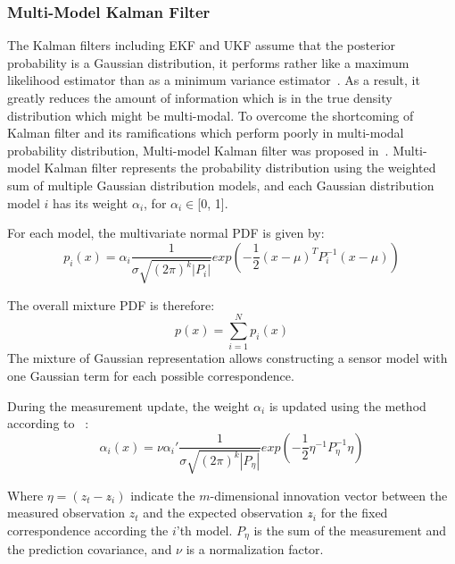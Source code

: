 \subsubsection{Multi-Model Kalman Filter}\label{sub:mmkalman}
The Kalman filters including \gls{EKF} and \gls{UKF} assume that the posterior probability is a Gaussian distribution, it performs rather like a maximum likelihood estimator than as a minimum variance estimator~\cite{alspach1972nonlinear}. As a result, it greatly reduces the amount of information which is in the true density distribution which might be multi-modal. To overcome the shortcoming of Kalman filter and its ramifications which perform poorly in multi-modal probability distribution, Multi-model Kalman filter was proposed in~\cite{alspach1972nonlinear}. Multi-model Kalman filter represents the probability distribution using the weighted sum of multiple Gaussian distribution models, and each Gaussian distribution model $i$ has its weight $\alpha_i$, for $\alpha_i \in $[0, 1].

For each model, the multivariate normal \gls{PDF} is given by:
\begin{equation}
\label{eq:mmkalman}
p_{i}(x) = \alpha_i\frac{1}{\sigma \sqrt {(2\pi)^k|P_i|}}exp(-\frac{1}{2}(x-\mu)^TP_i^{-1}(x-\mu))
\end{equation}

The overall mixture \gls{PDF} is therefore:
\begin{equation}
\label{eq:mmkalmansum}
p(x) = \sum_{i=1}^{N}p_i(x)
\end{equation}
The mixture of Gaussian representation allows constructing a sensor model with one Gaussian term for each possible correspondence.

During the measurement update, the weight $\alpha_i$ is updated using the method according to ~\cite{alspach1972nonlinear}:
\begin{equation}
\label{eq:weightupdate}
\alpha_{i}(x) = \nu\alpha_i'\frac{1}{\sigma \sqrt {(2\pi)^k|P_\eta|}}exp(-\frac{1}{2}\eta^{-1}P_\eta^{-1}\eta)
\end{equation}

Where $\eta = (z_t - z\widehat{}_i)$ indicate the $m$-dimensional innovation vector between the measured observation $z_t$ and the expected observation $z\widehat{}_i$ for the fixed correspondence according the $i$'th model. $P_\eta$ is the sum of the measurement and the prediction covariance, and $\nu$ is a normalization factor.

